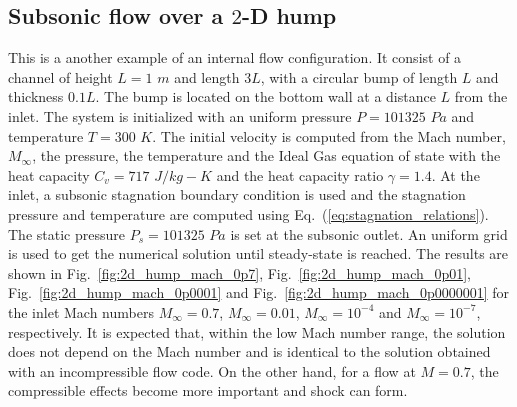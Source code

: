 \documentclass[preprint,10pt]{elsarticle}
\newcommand{\eqt}[1]{Eq.~(\ref{#1})}                     %
\newcommand{\fig}[1]{Fig.~\ref{#1}}                      %
\begin{document}
\subsection{Subsonic flow over a $2$-D hump} \label{sec:hump}
This is a another example of an internal flow configuration. It consist of a channel of height $L=1$ $m$ and length $3L$, with a circular bump of length $L$ and thickness $0.1L$. The bump is located on the bottom wall at a distance $L$ from the inlet. The system is initialized with an uniform pressure $P=101325$ $Pa$ and temperature $T=300$ $K$. The initial velocity is computed from the Mach number, $M_{\infty}$, the pressure, the temperature and the Ideal Gas equation of state with the heat capacity $C_v = 717$ $J/kg-K$ and the heat capacity ratio $\gamma=1.4$. At the inlet, a subsonic stagnation boundary condition is used and the stagnation pressure and temperature are computed using \eqt{eq:stagnation_relations}.
The static pressure $P_s = 101325$ $Pa$ is set at the subsonic outlet. An uniform grid is used to get the numerical solution until steady-state is reached. The results are shown in \fig{fig:2d_hump_mach_0p7}, \fig{fig:2d_hump_mach_0p01}, \fig{fig:2d_hump_mach_0p0001} and \fig{fig:2d_hump_mach_0p0000001} for the inlet Mach numbers $M_{\infty}=0.7$, $M_{\infty}=0.01$, $M_{\infty}=10^{-4}$ and $M_{\infty}=10^{-7}$, respectively. It is expected that, within the low Mach number range, the solution does not depend on the Mach number and is identical to the solution obtained with an incompressible flow code. On the other hand, for a flow at $M=0.7$, the compressible effects become more important and shock can form.
\end{document}
